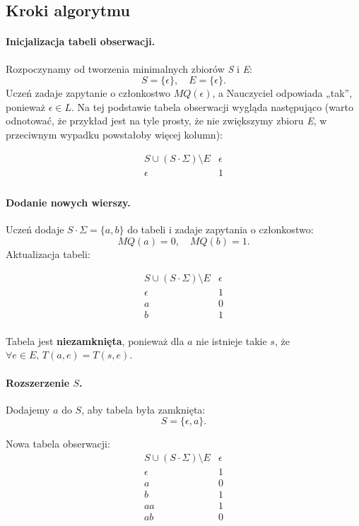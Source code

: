 \subsection*{Kroki algorytmu}

\paragraph*{Inicjalizacja tabeli obserwacji.}
Rozpoczynamy od tworzenia minimalnych zbiorów \textit{S} i \textit{E}:
\[
S = \{\epsilon\}, \quad E = \{\epsilon\}.
\]
Uczeń zadaje zapytanie o członkostwo \( MQ(\epsilon) \), a Nauczyciel odpowiada „tak”, ponieważ \( \epsilon \in L \). Na tej podstawie tabela obserwacji wygląda następująco (warto odnotować, że przykład jest na tyle prosty, że nie zwiększymy zbioru \textit{E}, w przeciwnym wypadku powstałoby więcej kolumn):

\[
\begin{array}{c|c}
S \cup (S \cdot \Sigma) \setminus E & \epsilon \\
\hline
\epsilon      & 1 \\
\end{array}
\]

\paragraph*{Dodanie nowych wierszy.}
Uczeń dodaje \( S \cdot \Sigma = \{a, b\} \) do tabeli i zadaje zapytania o członkostwo:
\[
MQ(a) = 0, \quad MQ(b) = 1.
\]
Aktualizacja tabeli:

\[
\begin{array}{c|c}
S \cup (S \cdot \Sigma) \setminus E & \epsilon \\
\hline
\epsilon      & 1 \\
\hline
a             & 0 \\
b             & 1 \\
\end{array}
\]

Tabela jest \textbf{niezamknięta}, ponieważ dla \(a\) nie istnieje takie \(s\), że \( \forall e \in E, \, T(a, e) = T(s, e) \).

\paragraph*{Rozszerzenie \( S \).}
Dodajemy \( a \) do \( S \), aby tabela była zamknięta:
\[
S = \{\epsilon, a\}.
\]

Nowa tabela obserwacji:
\[
\begin{array}{c|c}
S \cup (S \cdot \Sigma) \setminus E & \epsilon \\
\hline
\epsilon      & 1 \\
a             & 0 \\
\hline
b             & 1 \\
aa            & 1 \\
ab            & 0 \\
\end{array}
\]

